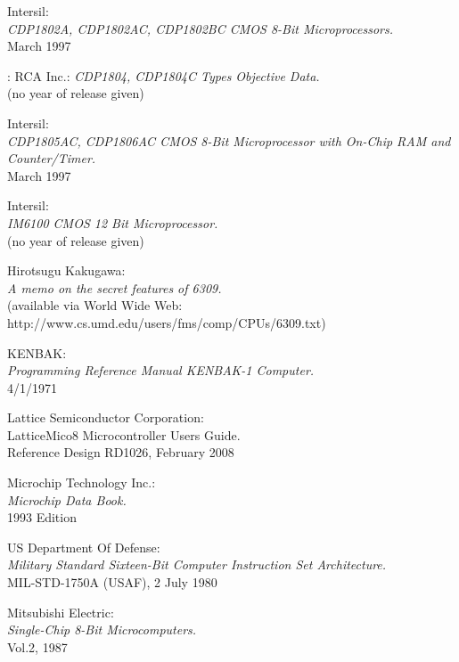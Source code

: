  Intersil: \\
                 {\em CDP1802A, CDP1802AC, CDP1802BC CMOS 8-Bit
                  Microprocessors.\/} \\
                 March 1997

: RCA Inc.:
                 {\em CDP1804, CDP1804C Types Objective Data.} \\
                 (no year of release given)

 Intersil: \\
                 {\em CDP1805AC, CDP1806AC CMOS 8-Bit Microprocessor
                  with On-Chip RAM and Counter/Timer.\/} \\
                 March 1997

 Intersil: \\
                 {\em IM6100 CMOS 12 Bit Microprocessor.\/} \\
                 (no year of release given)

 Hirotsugu Kakugawa: \\
               {\em A memo on the secret features of 6309.\/} \\
    	       (available via World Wide Web: \\
      	       http://www.cs.umd.edu/users/fms/comp/CPUs/6309.txt)

 KENBAK: \\
               {\em Programming Reference Manual KENBAK-1 Computer.} \\
               4/1/1971

 Lattice Semiconductor Corporation: \\
                   {LatticeMico8 Microcontroller Users Guide.\/} \\
                   Reference Design RD1026, February 2008

 Microchip Technology Inc.: \\
                    {\em Microchip Data Book.\/} \\
                    1993 Edition

 US Department Of Defense: \\
                  {\em Military Standard Sixteen-Bit Computer
                  Instruction Set Architecture.\/} \\
                  MIL-STD-1750A (USAF), 2 July 1980

 Mitsubishi Electric: \\
                {\em Single-Chip 8-Bit Microcomputers.\/} \\
                Vol.2, 1987

